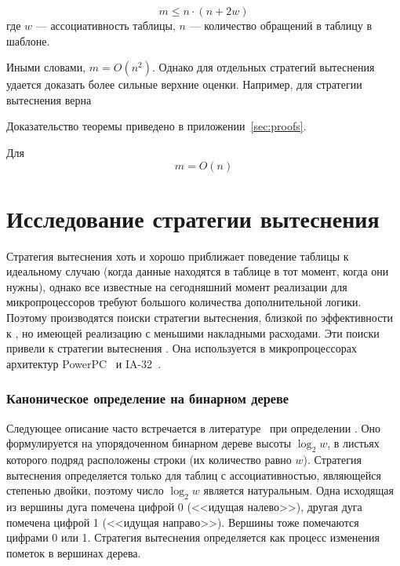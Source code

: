 \begin{utv}
$$m \leqslant n \cdot (n + 2w)$$
где $w$ --- ассоциативность таблицы, $n$ --- количество обращений в таблицу в шаблоне.
\end{utv}

Иными словами, $m = O(n^2)$. Однако для отдельных стратегий вытеснения удается доказать более сильные верхние оценки. Например, для стратегии вытеснения \LRU верна

\begin{theorem}\label{thm_mirror_lenth_lru} \UpperBoundLRUMirror
\end{theorem}
Доказательство теоремы приведено в приложении~\ref{sec:proofs}.
\begin{sld} Для \LRU
      $$m = O(n)$$
\end{sld}



\section{Исследование стратегии вытеснения \PseudoLRU}\label{sec:plru_new_definition}

Стратегия вытеснения \LRU хоть и хорошо приближает поведение
таблицы к идеальному случаю (когда данные находятся в
таблице в тот момент, когда они нужны), однако все известные на
сегодняшний момент реализации \LRU для микропроцессоров требуют большого
количества дополнительной логики. Поэтому производятся поиски
стратегии вытеснения, близкой по эффективности к \LRU, но имеющей
реализацию с меньшими накладными расходами. Эти поиски привели к
стратегии вытеснения \PseudoLRU. Она используется в микропроцессорах архитектур
PowerPC~\cite{PowerPC} и IA-32~\cite{FundamentalOfComputerOrganizationAndDesign}.

\subsubsection{Каноническое определение \PseudoLRU на бинарном дереве}

Следующее описание часто встречается в
литературе~\cite{FundamentalOfComputerOrganizationAndDesign} при
определении \PseudoLRU. Оно формулируется на
упорядоченном бинарном дереве высоты $\log_2 w$, в листьях которого
подряд расположены строки (их количество равно $w$). Стратегия вытеснения
\PseudoLRU
определяется только для таблиц с ассоциативностью, являющейся степенью двойки,
поэтому число $\log_2 w$ является натуральным. Одна исходящая из вершины дуга
помечена цифрой 0 (<<идущая налево>>), другая дуга помечена цифрой 1 (<<идущая
направо>>). Вершины тоже помечаются цифрами 0 или 1. Стратегия вытеснения
определяется как процесс изменения пометок в вершинах дерева.

